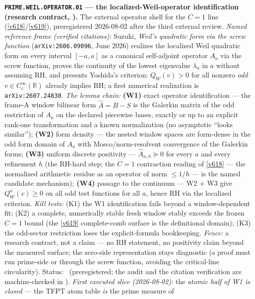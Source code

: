 \par\smallskip\noindent\textbf{\texttt{PRIME.WEIL.OPERATOR.01} --- the
localized-Weil-operator identification (research contract, \mO).}
The external operator shell for the $C=1$ line (\vref{v618}/\vref{v619}),
preregistered 2026-08-02 after the third external review.  \emph{Named
reference frame (verified citations):} Suzuki, \emph{Weil's quadratic
form via the screw function} (\texttt{arXiv:2606.09096}, June 2026)
realizes the localized Weil quadratic form on every interval $[-a,a]$
as a canonical self-adjoint operator $A_a$ via the screw function,
proves the continuity of the lowest eigenvalue $\lambda_a$ in $a$
without assuming RH, and presents Yoshida's criterion: $Q_W(v)>0$ for
all nonzero \emph{odd} $v\in C_c^\infty(\mathbb R)$ already implies RH;
a first numerical realization is \texttt{arXiv:2607.24830}.  \emph{The
lemma chain:} \textbf{(W1)} exact operator identification --- the
frame-A window bilinear form $\widehat A=B-S$ is the Galerkin matrix of
the odd restriction of $A_a$ on the declared piecewise bases, exactly
or up to an explicit rank-one transformation and a known normalization
(no asymptotic ``looks similar''); \textbf{(W2)} form density --- the
nested window spaces are form-dense in the odd form domain of $A_a$
with Mosco/norm-resolvent convergence of the Galerkin forms;
\textbf{(W3)} uniform discrete positivity --- $\widehat A_{a,h}\succeq0$
for every $a$ and every refinement $h$ (the RH-hard step; the $C=1$
contraction reading of \vref{v618} --- the normalized arithmetic
residue as an operator of norm $\le1/h$ --- is the named candidate
mechanism); \textbf{(W4)} passage to the continuum --- W2 $+$ W3 give
$Q_W^a(v)\ge0$ on all odd test functions for all $a$, hence RH via the
localized criterion.  \emph{Kill tests:} (K1) the W1 identification
fails beyond a window-dependent fit; (K2) a complete, numerically
stable fresh window stably exceeds the frozen $C=1$ bound (the
\vref{v619} complete-comb surface is the definitional domain); (K3) the
odd-sector restriction loses the explicit-formula bookkeeping.
\emph{Fence:} a research contract, not a claim --- no RH statement, no
positivity claim beyond the measured surface; the zero-side
representation stays diagnostic (a proof must run prime-side or through
the screw function, avoiding the critical-line circularity).  Status:
\mO\ (preregistered; the audit and the citation verification are
machine-checked in ).
\emph{First executed slice (2026-08-02):} the \emph{atomic half of W1
is closed} --- the TFPT atom table \emph{is} the prime measure of
